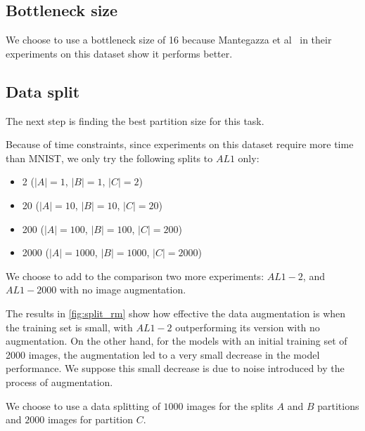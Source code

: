         \subsection{Bottleneck size}
            We choose to use a bottleneck size of 16 because Mantegazza et al~\cite{mantegazza2022sensing} in their experiments on this dataset show it performs better.
            
        \subsection{Data split}
            The next step is finding the best partition size for this task.
            
            Because of time constraints, since experiments on this dataset require more time than MNIST, we only try the following splits to $AL1$ only:
            
            \begin{itemize}
                \item 2 ($|A| = 1$, $ |B| = 1$, $|C| = 2$)
                \item 20 ($|A| = 10$, $ |B| = 10$, $|C| = 20$)
                \item 200 ($|A| = 100$, $ |B| = 100$, $|C| = 200$)
                \item 2000 ($|A| = 1000$, $ |B| = 1000$, $|C| = 2000$)
            \end{itemize}
            
            \noindent We choose to add to the comparison two more experiments: $AL1-2$, and $AL1-2000$ with no image augmentation.
            
            
            The results in \autoref{fig:split_rm} show how effective the data augmentation is when the training set is small, with $AL1-2$ outperforming its version with no augmentation. On the other hand, for the models with an initial training set of 2000 images, the augmentation led to a very small decrease in the model performance. We suppose this small decrease is due to noise introduced by the process of augmentation.
            
            
            We choose to use a data splitting of $1000$ images for the splits $A$ and $B$ partitions and $2000$ images for partition $C$.
            
